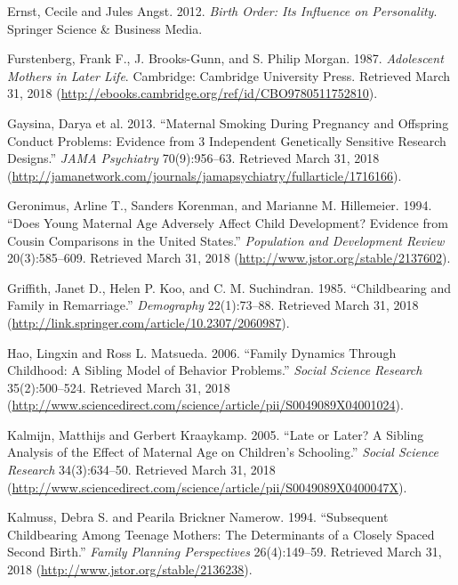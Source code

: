 \documentclass[]{article}
\begin{document}
\hypertarget{ref-ernst_birth_2012}{}
Ernst, Cecile and Jules Angst. 2012. \emph{Birth Order: Its Influence on
Personality}. Springer Science \& Business Media.

\hypertarget{ref-furstenberg_adolescent_1987}{}
Furstenberg, Frank F., J. Brooks-Gunn, and S. Philip Morgan. 1987.
\emph{Adolescent Mothers in Later Life}. Cambridge: Cambridge University
Press. Retrieved March 31, 2018
(\url{http://ebooks.cambridge.org/ref/id/CBO9780511752810}).

\hypertarget{ref-gaysina_maternal_2013}{}
Gaysina, Darya et al. 2013. ``Maternal Smoking During Pregnancy and
Offspring Conduct Problems: Evidence from 3 Independent Genetically
Sensitive Research Designs.'' \emph{JAMA Psychiatry} 70(9):956--63.
Retrieved March 31, 2018
(\url{http://jamanetwork.com/journals/jamapsychiatry/fullarticle/1716166}).

\hypertarget{ref-geronimus_does_1994}{}
Geronimus, Arline T., Sanders Korenman, and Marianne M. Hillemeier.
1994. ``Does Young Maternal Age Adversely Affect Child Development?
Evidence from Cousin Comparisons in the United States.''
\emph{Population and Development Review} 20(3):585--609. Retrieved March
31, 2018 (\url{http://www.jstor.org/stable/2137602}).

\hypertarget{ref-griffith_childbearing_1985}{}
Griffith, Janet D., Helen P. Koo, and C. M. Suchindran. 1985.
``Childbearing and Family in Remarriage.'' \emph{Demography}
22(1):73--88. Retrieved March 31, 2018
(\url{http://link.springer.com/article/10.2307/2060987}).

\hypertarget{ref-hao_family_2006}{}
Hao, Lingxin and Ross L. Matsueda. 2006. ``Family Dynamics Through
Childhood: A Sibling Model of Behavior Problems.'' \emph{Social Science
Research} 35(2):500--524. Retrieved March 31, 2018
(\url{http://www.sciencedirect.com/science/article/pii/S0049089X04001024}).

\hypertarget{ref-kalmijn_late_2005}{}
Kalmijn, Matthijs and Gerbert Kraaykamp. 2005. ``Late or Later? A
Sibling Analysis of the Effect of Maternal Age on Children's
Schooling.'' \emph{Social Science Research} 34(3):634--50. Retrieved
March 31, 2018
(\url{http://www.sciencedirect.com/science/article/pii/S0049089X0400047X}).

\hypertarget{ref-kalmuss_subsequent_1994}{}
Kalmuss, Debra S. and Pearila Brickner Namerow. 1994. ``Subsequent
Childbearing Among Teenage Mothers: The Determinants of a Closely Spaced
Second Birth.'' \emph{Family Planning Perspectives} 26(4):149--59.
Retrieved March 31, 2018 (\url{http://www.jstor.org/stable/2136238}).
\end{document}
